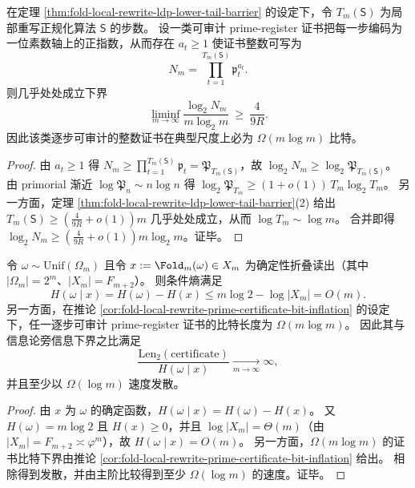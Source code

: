 \begin{corollary}\label{cor:fold-local-rewrite-prime-certificate-bit-inflation}
在定理 \ref{thm:fold-local-rewrite-ldp-lower-tail-barrier} 的设定下，令 \(T_m(\mathsf S)\) 为局部重写正规化算法 \(\mathsf S\) 的步数。
设一类可审计 prime-register 证书把每一步编码为一位素数轴上的正指数，从而存在 \(a_t\ge 1\) 使证书整数可写为
\[
N_m=\prod_{t=1}^{T_m(\mathsf S)}\mathfrak p_t^{a_t}.
\]
则几乎处处成立下界
\[
\liminf_{m\to\infty}\frac{\log_2 N_m}{m\log_2 m}\ \ge\ \frac{4}{9R}.
\]
因此该类逐步可审计的整数证书在典型尺度上必为 \(\Omega(m\log m)\) 比特。
\end{corollary}
\begin{proof}
由 \(a_t\ge 1\) 得
\(
N_m\ge \prod_{t=1}^{T_m(\mathsf S)}\mathfrak p_t=\mathfrak P_{T_m(\mathsf S)}
\)，故 \(\log_2 N_m\ge \log_2\mathfrak P_{T_m(\mathsf S)}\)。
由 primorial 渐近 \(\log \mathfrak P_n\sim n\log n\) 得
\(
\log_2\mathfrak P_{T_m}\ge (1+o(1))\,T_m\log_2 T_m
\)。
另一方面，定理 \ref{thm:fold-local-rewrite-ldp-lower-tail-barrier}(2) 给出
\(
T_m(\mathsf S)\ge (\frac{4}{9R}+o(1))m
\)
几乎处处成立，从而 \(\log T_m\sim \log m\)。
合并即得
\(
\log_2 N_m\ge (\frac{4}{9R}+o(1))m\log_2 m
\)。证毕。
\end{proof}

\begin{proposition}[算术可审计性与信息论旁信息下界之间的发散缺口]\label{prop:fold-prime-certificate-vs-it-gap-diverges}
令 \(\omega\sim\mathrm{Unif}(\Omega_m)\) 且令 \(x:=\Fold_m(\omega)\in X_m\) 为确定性折叠读出（其中 \(|\Omega_m|=2^m\)、\(|X_m|=F_{m+2}\)）。
则条件熵满足
\[
H(\omega\mid x)=H(\omega)-H(x)\le m\log 2-\log|X_m|=O(m).
\]
另一方面，在推论 \ref{cor:fold-local-rewrite-prime-certificate-bit-inflation} 的设定下，任一逐步可审计 prime-register 证书的比特长度为 \(\Omega(m\log m)\)。
因此其与信息论旁信息下界之比满足
\[
\frac{\mathrm{Len}_2(\mathrm{certificate})}{H(\omega\mid x)}\xrightarrow[m\to\infty]{}\infty,
\]
并且至少以 \(\Omega(\log m)\) 速度发散。
\end{proposition}
\begin{proof}
由 \(x\) 为 \(\omega\) 的确定函数，\(H(\omega\mid x)=H(\omega)-H(x)\)。
又 \(H(\omega)=m\log 2\) 且 \(H(x)\ge 0\)，并且 \(\log|X_m|=\Theta(m)\)（由 \(|X_m|=F_{m+2}\asymp\varphi^{m}\)），故 \(H(\omega\mid x)=O(m)\)。
另一方面，\(\Omega(m\log m)\) 的证书比特下界由推论 \ref{cor:fold-local-rewrite-prime-certificate-bit-inflation} 给出。
相除得到发散，并由主阶比较得到至少 \(\Omega(\log m)\) 的速度。证毕。
\end{proof}

